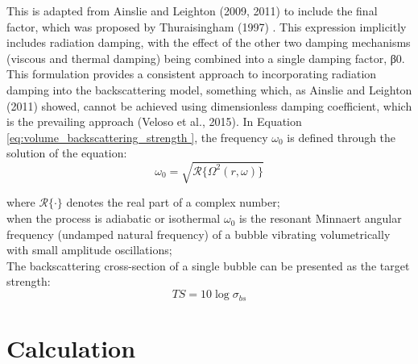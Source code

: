 \documentclass[11pt]{article}
\begin{document}
This is adapted from Ainslie and Leighton (2009, 2011) \cite{ainslie_near_2009, ainslie_review_2011}  to include the final factor, which was proposed by Thuraisingham (1997) \cite{thuraisingham_new_1997}. This expression implicitly includes radiation damping, with the effect of the other two damping mechanisms (viscous and thermal damping) being combined into a single damping factor, β0. This formulation provides a consistent approach to incorporating radiation damping into the backscattering model, something which, as Ainslie and Leighton (2011)\cite{ainslie_review_2011} showed, cannot be achieved using dimensionless damping coefficient, which is the prevailing approach (Veloso et al., 2015)\cite{veloso_new_2015}. In Equation \ref{eq:volume_backscattering_strength }, the frequency $\omega_0$ is defined through the solution of the equation:
\begin{equation}\label{eqn:natural_freq}
\omega_0 = \sqrt{\mathcal{R}\{\Omega^2(r,\omega)\}}
\end{equation}

where  $\mathcal{R}\{·\}$ denotes the real part of a complex number;\\
 when the process is adiabatic or isothermal  $\omega_{0}$ is the resonant Minnaert angular frequency (undamped natural frequency) of a bubble vibrating volumetrically with small amplitude oscillations; \\

	The backscattering cross-section of a single bubble can be presented as the target strength:
\begin{equation}\label{eq:target_strength}
	TS = 10\log{\sigma_{bs}}
\end{equation}




\section{Calculation}
\end{document}
